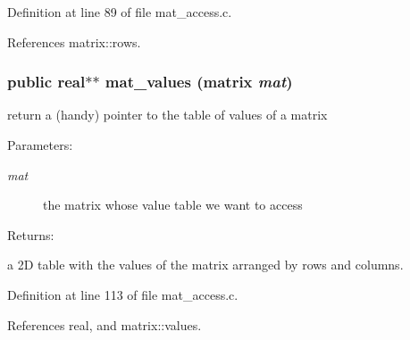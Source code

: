 Definition at line 89 of file mat\_\-access.c.

References matrix::rows.
\subsubsection{\setlength{\rightskip}{0pt plus 5cm}public {\bf real}$\ast$$\ast$ mat\_\-values ({\bf matrix} {\em mat})}\label{group__matrix__access_a2}


return a (handy) pointer to the table of values of a matrix

\begin{Desc}
\item[Parameters: ]\par
\begin{description}
\item[{\em 
mat}]the matrix whose value table we want to access \end{description}
\end{Desc}
\begin{Desc}
\item[Returns: ]\par
a 2D table with the values of the matrix arranged by rows and columns. \end{Desc}


Definition at line 113 of file mat\_\-access.c.

References real, and matrix::values.